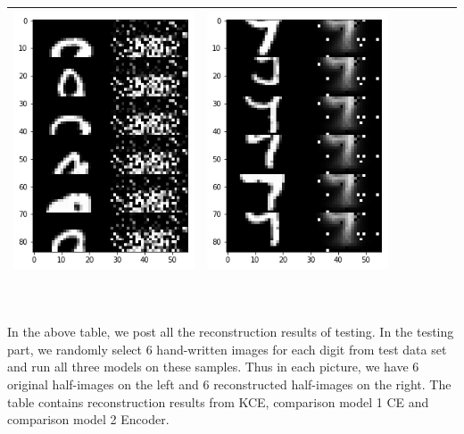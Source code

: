 \documentclass[12pt]{report} %
\begin{document}
\begin{tabular}{m{0.7cm}m{2.4cm}m{2.4cm}m{2.4cm}m{2.4cm}m{2.4cm}m{2.4cm}}
\includegraphics[scale=0.3]{pictures/M2_9_up.png} & \includegraphics[scale=0.3]{pictures/M2_9_down.png}\\
\bottomrule
\end{tabular}
\\
\\
In the above table, we post all the reconstruction results of testing. In the testing part, we randomly select 6 hand-written images for each digit from test data set and run all three models on these samples. Thus in each picture, we have 6 original half-images on the left and 6 reconstructed half-images on the right. The table contains reconstruction results from KCE, comparison model 1 CE and comparison model 2 Encoder. \\
\end{document}
